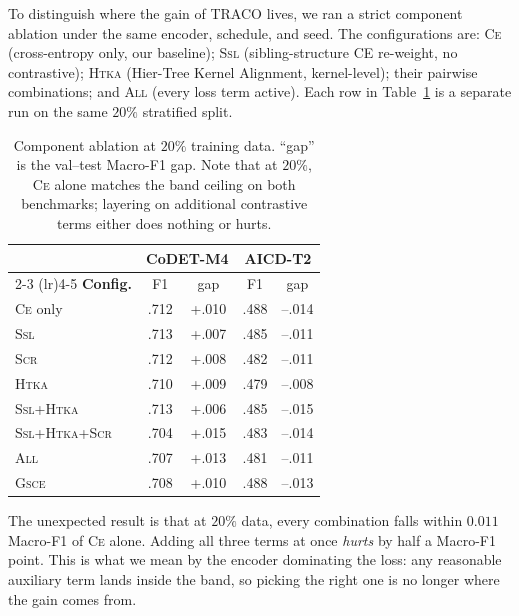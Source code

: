 ﻿\documentclass[11pt]{article}
\newcommand{\method}{\textsc{TRACO}\xspace}
\begin{document}
To distinguish where the gain of \method lives, we ran a strict
component ablation under the same encoder, schedule, and seed. The
configurations are: \textsc{Ce} (cross-entropy only, our baseline);
\textsc{Ssl} (sibling-structure CE re-weight, no contrastive);
\textsc{Htka} (Hier-Tree Kernel Alignment, kernel-level); their
pairwise combinations; and \textsc{All} (every loss term active).
Each row in Table~\ref{tab:abldetail} is a separate run on the same
$20\%$ stratified split.

\begin{table}[ht]
\centering\footnotesize
\setlength{\tabcolsep}{3pt}
\begin{tabular}{@{}l cc cc@{}}
\toprule
& \multicolumn{2}{c}{\textbf{CoDET-M4}}
& \multicolumn{2}{c}{\textbf{AICD-T2}} \\
\cmidrule(lr){2-3} \cmidrule(lr){4-5}
\textbf{Config.} & F1 & gap & F1 & gap \\
\midrule
\textsc{Ce} only       & .712 & +.010 & .488 & --.014 \\
\textsc{Ssl}           & .713 & +.007 & .485 & --.011 \\
\textsc{Scr}           & .712 & +.008 & .482 & --.011 \\
\textsc{Htka}          & .710 & +.009 & .479 & --.008 \\
\textsc{Ssl+Htka}      & .713 & +.006 & .485 & --.015 \\
\textsc{Ssl+Htka+Scr}  & .704 & +.015 & .483 & --.014 \\
\textsc{All}           & .707 & +.013 & .481 & --.011 \\
\textsc{Gsce}          & .708 & +.010 & .488 & --.013 \\
\bottomrule
\end{tabular}
\caption{\label{tab:abldetail}
Component ablation at $20\%$ training data. ``gap'' is the
val--test Macro-F1 gap. Note that at $20\%$, \textsc{Ce} alone
matches the band ceiling on both benchmarks; layering on
additional contrastive terms either does nothing or hurts.}
\end{table}

The unexpected result is that at $20\%$ data, every combination
falls within $0.011$ Macro-F1 of \textsc{Ce} alone. Adding all three
terms at once \emph{hurts} by half a Macro-F1 point. This is what we
mean by the encoder dominating the loss: any reasonable auxiliary
term lands inside the band, so picking the right one is no longer
where the gain comes from.

\end{document}

